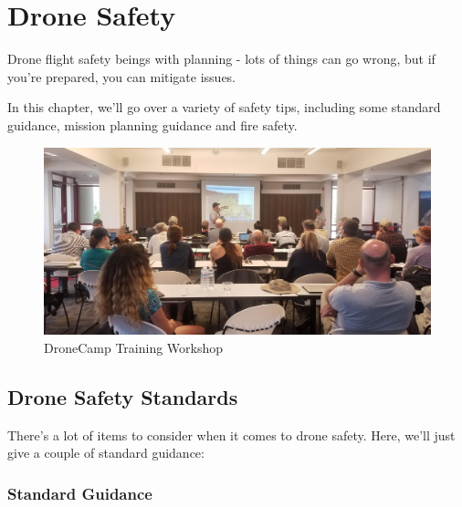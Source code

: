 \documentclass[
  12pt,
]{book}
\begin{document}
\chapter{Drone Safety}\label{safety}

Drone flight safety beings with planning - lots of things can go wrong, but if you're prepared, you can mitigate issues.

In this chapter, we'll go over a variety of safety tips, including some standard guidance, mission planning guidance and fire safety.

\begin{figure}

{\centering \includegraphics[width=0.75\linewidth]{images/training_1} 

}

\caption{DroneCamp Training Workshop}\label{fig:training}
\end{figure}

\section{Drone Safety Standards}\label{drone-safety-standards}

There's a lot of items to consider when it comes to drone safety. Here, we'll just give a couple of standard guidance:

\subsection{Standard Guidance}\label{standard-guidance}
\end{document}
